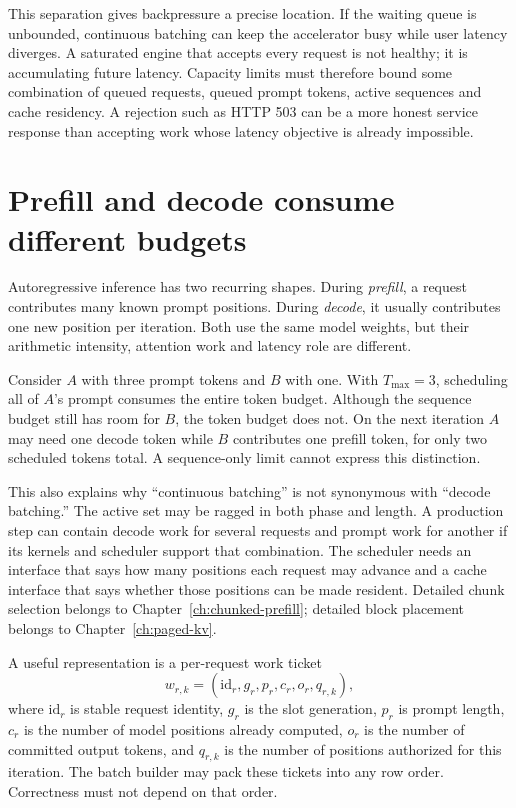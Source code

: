 This separation gives backpressure a precise location. If the waiting queue is
unbounded, continuous batching can keep the accelerator busy while user
latency diverges. A saturated engine that accepts every request is not
healthy; it is accumulating future latency. Capacity limits must therefore
bound some combination of queued requests, queued prompt tokens, active
sequences and cache residency. A rejection such as HTTP 503 can be a more
honest service response than accepting work whose latency objective is already
impossible.

\section{Prefill and decode consume different budgets}

Autoregressive inference has two recurring shapes. During \emph{prefill}, a
request contributes many known prompt positions. During \emph{decode}, it
usually contributes one new position per iteration. Both use the same model
weights, but their arithmetic intensity, attention work and latency role are
different.

Consider $A$ with three prompt tokens and $B$ with one. With
$T_{\max}=3$, scheduling all of $A$'s prompt consumes the entire token budget.
Although the sequence budget still has room for $B$, the token budget does
not. On the next iteration $A$ may need one decode token while $B$ contributes
one prefill token, for only two scheduled tokens total. A sequence-only limit
cannot express this distinction.

This also explains why ``continuous batching'' is not synonymous with
``decode batching.'' The active set may be ragged in both phase and length.
A production step can contain decode work for several requests and prompt work
for another if its kernels and scheduler support that combination. The
scheduler needs an interface that says how many positions each request may
advance and a cache interface that says whether those positions can be made
resident. Detailed chunk selection belongs to
Chapter~\ref{ch:chunked-prefill}; detailed block placement belongs to
Chapter~\ref{ch:paged-kv}.

A useful representation is a per-request work ticket
\[
  w_{r,k}=(\mathrm{id}_r,g_r,p_r,c_r,o_r,q_{r,k}),
\]
where $\mathrm{id}_r$ is stable request identity, $g_r$ is the slot generation,
$p_r$ is prompt length, $c_r$ is the number of model positions already
computed, $o_r$ is the number of committed output tokens, and $q_{r,k}$ is
the number of positions authorized for this iteration. The batch builder may
pack these tickets into any row order. Correctness must not depend on that
order.

